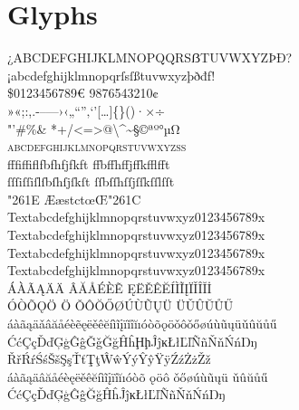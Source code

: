 \documentclass[pagesize,DIV14]{scrartcl}
\begin{document}
\section{Glyphs}
\fontsize{16}{16}
\begin{center}
{
¿ABCDEFGHIJKLMNOPQQRSẞTUVWXYZÞÐ?\\
¡abcdefghijklmnopqrſsſßtuvwxyzþðđf!\\
\$0123456789€  {9876543210}¢\\
»«;:,.-–—›‹„“”‚‘’[…]\{\}()·×÷\\
"'\#\%\& *+/<=>@\textbackslash \textasciicircum \textasciitilde §©ªº°µΩ\\
\textsc{abcdefghijklmnopqrstuvwxyzß}\\ 
fffiffiflfbfhfjfkft%
ffbffhffjffkfflfft\\
ſſſiſſiſlſbſhſjſkſt%
ſſbſſhſſjſſkſſlſſt\\
\char"261E ÆæstctœŒ\char"261C\\
{
Text{abcdefghijklmnopqrstuvwxyz0123456789}x %
Text{abcdefghijklmnopqrstuvwxyz0123456789}x\\
Text{abcdefghijklmnopqrstuvwxyz0123456789}x %
Text{abcdefghijklmnopqrstuvwxyz0123456789}x}\\
ÁÀÃĄÄ{Ä}%
ÂĂÅÉÈẼ%
ĘËĚÊĔÍÌĨĮÏǏÎĬİ\\
ÓÒÕǪÖ%
{Ö}%
ǑÔŎŐØÚÙŨŲÜ%
{Ü}ǓÛŬŮŰ\\
áàãąäǎâăåéèẽęëěêĕíìĩįïǐîĭıóòõǫöǒôǒőøúùũųüǔûŭůű\\
ĆćÇçĎďĢģĜĝǦǧĞğĤĥḨḩĴĵĸŁłĽľÑñŇňŃńŊŋ\\
ŘřŔŕŚśŠšŞşŤťŢţŴŵÝýŶŷŸÿŹźŻżŽž\\
{%
áàãąäâăåéèęëěêĕíìĩįïîĭıóòõ%
{ǫ}öô%
{ǒ}őøúùũųü%
{ǔ}ûŭůű\\
ĆćÇçĎďĢģĜĝĞğĤĥĴĵĸŁłĽľÑñŇňŃńŊŋ\\
}}
\end{center}
\end{document}
